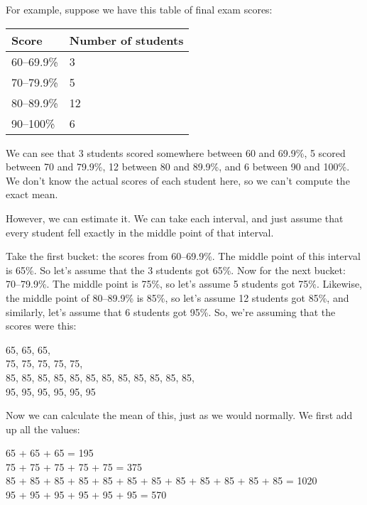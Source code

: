 \documentclass[../../../main.tex]{subfiles}
\begin{document}
For example, suppose we have this table of final exam scores:

\begin{center}
  \begin{tabular}{| l | l |}
    \hline
    \textbf{Score} & \textbf{Number of students} \\ \hline
    60--69.9\% & 3\\ \hline
    70--79.9\% &  5 \\ \hline
    80--89.9\% &  12 \\ \hline
    90--100\% & 6 \\ \hline
  \end{tabular}
\end{center}

\noindent
We can see that 3 students scored somewhere between 60 and 69.9\%, 5 scored between 70 and 79.9\%, 12 between 80 and 89.9\%, and 6 between 90 and 100\%. We don't know the actual scores of each student here, so we can't compute the exact mean.

However, we can estimate it. We can take each interval, and just assume that every student fell exactly in the middle point of that interval.

Take the first bucket: the scores from 60--69.9\%. The middle point of this interval is 65\%. So let's assume that the 3 students got 65\%. Now for the next bucket: 70--79.9\%. The middle point is 75\%, so let's assume 5 students got 75\%. Likewise, the middle point of 80--89.9\% is 85\%, so let's assume 12 students got 85\%, and similarly, let's assume that 6 students got 95\%. So, we're assuming that the scores were this:

\begin{center}
  65, 65, 65, \\
  75, 75, 75, 75, 75, \\
  85, 85, 85, 85, 85, 85, 85, 85, 85, 85, 85, 85, \\
  95, 95, 95, 95, 95, 95
\end{center}

\noindent
Now we can calculate the mean of this, just as we would normally. We first add up all the values:

\begin{center}
  65 + 65 + 65 =  195 \\
  75 + 75 + 75 + 75 + 75 = 375 \\
  85 + 85 + 85 + 85 + 85 + 85 + 85 + 85 + 85 + 85 + 85 + 85 = 1020 \\
  95 + 95 + 95 + 95 + 95 + 95 = 570
\end{center}
\end{document}
